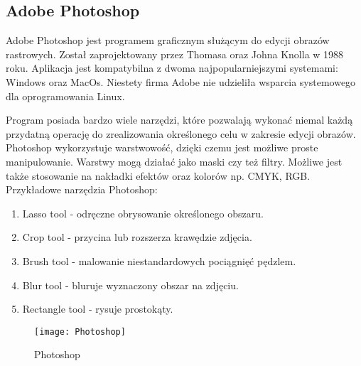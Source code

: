 \documentclass[12pt, a4paper, onside, polish]{article}				%
\begin{document}
\subsection{Adobe Photoshop}
\hspace{\parindent}
Adobe Photoshop jest programem graficznym służącym do edycji obrazów rastrowych. Został zaprojektowany przez Thomasa oraz Johna Knolla w 1988 roku. Aplikacja jest kompatybilna z dwoma najpopularniejszymi systemami: Windows oraz MacOs. Niestety firma Adobe nie udzieliła wsparcia systemowego dla oprogramowania Linux.  

Program posiada bardzo wiele narzędzi, które pozwalają wykonać niemal każdą przydatną operację do zrealizowania określonego celu w zakresie edycji obrazów. Photoshop wykorzystuje warstwowość, dzięki czemu jest możliwe proste manipulowanie. Warstwy mogą działać jako maski czy też filtry. Możliwe jest także stosowanie na nakładki efektów oraz kolorów np. CMYK, RGB.  
\newline\newline
Przykładowe narzędzia Photoshop:
 \begin{enumerate}
\item Lasso tool - odręczne obrysowanie określonego obszaru.
\item Crop tool - przycina lub rozszerza krawędzie zdjęcia.
\item Brush tool - malowanie niestandardowych pociągnięć pędzlem.
\item Blur tool - bluruje wyznaczony obszar na zdjęciu.
\item Rectangle tool - rysuje prostokąty. \newline
 \end{enumerate}
   	\begin{figure}[hbt!]
  	  {\centering \texttt{[image: Photoshop]} \caption{Photoshop}}\vspace{5mm}
  	 \end{figure}
  	 
\cleardoublepage
\end{document}
